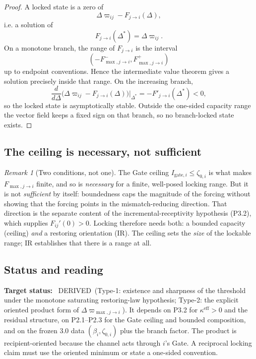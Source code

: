 \documentclass[11pt,a4paper]{article}
\newcommand{\stDerived}{\textcolor{cDer}{\textsf{\small DERIVED}}}
\theoremstyle{definition}
\theoremstyle{plain}
\theoremstyle{remark}
\newtheorem{remark}[definition]{Remark}
\begin{document}
\begin{proof}
A locked state is a zero of
\[
\Delta\varpi_{ij}-F_{j\to i}(\Delta),
\]
i.e. a solution of
\[
F_{j\to i}(\Delta^*)=\Delta\varpi_{ij}.
\]
On a monotone branch, the range of \(F_{j\to i}\) is the interval
\[
(-F^-_{\max,j\to i},F^+_{\max,j\to i})
\]
up to endpoint conventions. Hence the intermediate value theorem gives a solution
precisely inside that range. On the increasing branch,
\[
\frac{d}{d\Delta}
\bigl(\Delta\varpi_{ij}-F_{j\to i}(\Delta)\bigr)\big|_{\Delta^*}
=
-F'_{j\to i}(\Delta^*)<0,
\]
so the locked state is asymptotically stable. Outside the one-sided capacity
range the vector field keeps a fixed sign on that branch, so no branch-locked
state exists. \qedhere
\end{proof}

\subsection{The ceiling is necessary, not sufficient}

\begin{remark}[Two conditions, not one]\label{rem:ceilingnec}
The Gate ceiling \(I_{\mathrm{gate},i}\le\zeta_{0,i}\) is what makes \(F_{\max,j\to i}\) finite,
and so is \emph{necessary} for a finite, well-posed locking range. But it is not
\emph{sufficient} by itself: boundedness caps the magnitude of the forcing without showing
that the forcing points in the mismatch-reducing direction. That direction is the separate
content of the incremental-receptivity hypothesis (P3.2), which supplies \(F_{ij}'(0)>0\).
Locking therefore needs both: a bounded capacity (ceiling) \emph{and} a restoring
orientation (IR). The ceiling sets the \emph{size} of the lockable range; IR establishes
that there is a range at all.
\end{remark}

\subsection{Status and reading}

\textbf{Target status:}~
\stDerived\ (Type-1: existence and sharpness of the threshold under the monotone
saturating restoring-law hypothesis; Type-2: the explicit oriented product form of
\(\Delta\varpi_{\max,j\to i}\)). It depends on P3.2 for
\(\kappa^{\mathrm{eff}}>0\) and the residual structure, on P2.1--P2.3 for the Gate
ceiling and bounded composition, and on the frozen 3.0 data
\((\beta_i,\zeta_{0,i})\) plus the branch factor. The product is recipient-oriented
because the channel acts through \(i\)'s Gate. A reciprocal locking claim must use
the oriented minimum or state a one-sided convention.
\end{document}
